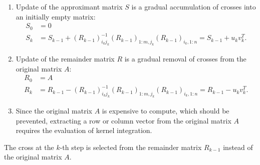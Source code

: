 \documentclass[11pt, a4paper]{article}
\begin{document}
\begin{enumerate}
\item Update of the approximant matrix $S$ is a gradual accumulation of crosses into an initially empty matrix:
  \begin{equation*}
    \begin{split} S_0 &= 0 \\ S_{k} &= S_{k-1}+(R_{k-1})_{i_k
        j_k}^{-1}(R_{k-1})_{1:m,j_k}(R_{k-1})_{i_k,1:n} = S_{k-1} + u_kv_k^T.
    \end{split}
  \end{equation*}
\item Update of the remainder matrix $R$ is a gradual removal of crosses from the original matrix $A$:
  \begin{equation*}
    \begin{split} R_0 &= A \\ R_{k} &= R_{k-1}-(R_{k-1})_{i_k
        j_k}^{-1}(R_{k-1})_{1:m,j_k}(R_{k-1})_{i_k,1:n} = R_{k-1}-u_kv_k^T.
    \end{split}
  \end{equation*}
\item Since the original matrix $A$ is expensive to compute, which should be prevented, extracting a row or column vector from the original matrix $A$ requires the evaluation of kernel integration.
\end{enumerate}

\begin{remark} The cross at the $k$-th step is selected from the remainder matrix $R_{k-1}$ instead of the original matrix $A$.
\end{remark}
\end{document}
